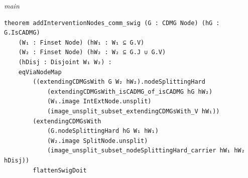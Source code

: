 {\small\textit{main}}
\begin{verbatim}
theorem addInterventionNodes_comm_swig (G : CDMG Node) (hG : G.IsCADMG)
    (W₁ : Finset Node) (hW₁ : W₁ ⊆ G.V)
    (W₂ : Finset Node) (hW₂ : W₂ ⊆ G.J ∪ G.V)
    (hDisj : Disjoint W₁ W₂) :
    eqViaNodeMap
        ((extendingCDMGsWith G W₂ hW₂).nodeSplittingHard
            (extendingCDMGsWith_isCADMG_of_isCADMG hG hW₂)
            (W₁.image IntExtNode.unsplit)
            (image_unsplit_subset_extendingCDMGsWith_V hW₁))
        (extendingCDMGsWith
            (G.nodeSplittingHard hG W₁ hW₁)
            (W₂.image SplitNode.unsplit)
            (image_unsplit_subset_nodeSplittingHard_carrier hW₁ hW₂ hDisj))
        flattenSwigDoit
\end{verbatim}
~%

\vspace{\appendixNotesGap}

